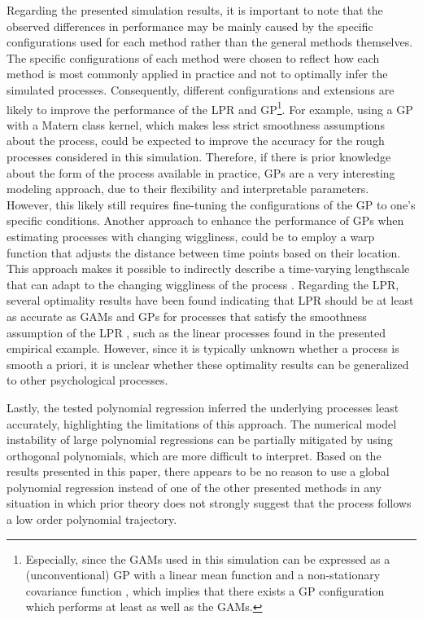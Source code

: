 \documentclass[man, floatsintext]{apa7}
\begin{document}
Regarding the presented simulation results, it is important to note that the
observed differences in performance may be mainly caused by the specific
configurations used for each method rather than the general methods themselves.
The specific configurations of each method were chosen to reflect how each
method is most commonly applied in practice and not to optimally infer the
simulated processes. Consequently, different configurations and extensions are
likely to improve the performance of the LPR and GP\footnote{Especially, since
  the GAMs used in this simulation can be expressed as a (unconventional) GP
  with
  a linear mean function and a non-stationary covariance function
  \parencite{wahba_improper_1978, rasmussen_gaussian_2006}, which implies that
  there exists a GP configuration which performs at least as well as the
  GAMs.}.
For example, using a GP with a Matern class kernel, which makes less strict
smoothness assumptions about the process, could be expected to improve the
accuracy for the rough processes considered in this simulation. Therefore, if
there is prior knowledge about the form of the process available in practice,
GPs are a very interesting modeling approach, due to their flexibility and
interpretable parameters. However, this likely still requires fine-tuning the
configurations of the GP to one's specific conditions. Another approach to
enhance the performance of GPs when estimating processes with changing
wiggliness, could be to employ a warp function that adjusts the distance
between time points based on their location. This approach makes it possible to
indirectly describe a time-varying lengthscale that can adapt to the changing
wiggliness of the process \parencite{tolpin_warped_2019}. Regarding the LPR,
several optimality results have been found indicating that LPR should be at
least as accurate as GAMs and GPs for processes that satisfy the smoothness
assumption of the LPR \parencite{fan_local_1997}, such as the linear processes
found in the presented empirical example. However, since it is typically
unknown whether a process is smooth a priori, it is unclear whether these
optimality results can be generalized to other psychological processes.

Lastly,
the tested polynomial regression inferred the underlying processes least
accurately, highlighting the limitations of this approach. The numerical model
instability of large polynomial regressions can be partially mitigated by using
orthogonal polynomials, which are more difficult to interpret. Based on
the results presented in this paper, there appears to be no reason to use a
global polynomial regression instead of one of the other presented methods in
any situation in which prior theory does not strongly suggest that the process
follows a low order polynomial trajectory.
\end{document}
